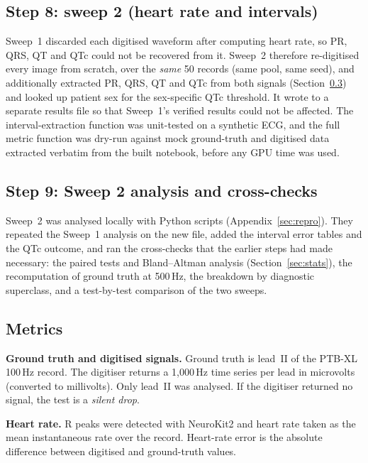 \subsection{Step 8: sweep 2 (heart rate and intervals)}\label{sec:sweep2}
Sweep~1 discarded each digitised waveform after computing heart rate, so PR, QRS, QT and QTc could not be recovered from it. Sweep~2 therefore re-digitised every image from scratch, over the \emph{same} 50 records (same pool, same seed), and additionally extracted PR, QRS, QT and QTc from both signals (Section~\ref{sec:metrics}) and looked up patient sex for the sex-specific QTc threshold. It wrote to a separate results file so that Sweep~1's verified results could not be affected. The interval-extraction function was unit-tested on a synthetic ECG, and the full metric function was dry-run against mock ground-truth and digitised data extracted verbatim from the built notebook, before any GPU time was used.

\subsection{Step 9: Sweep 2 analysis and cross-checks}\label{sec:sweep2analysis}
Sweep~2 was analysed locally with Python scripts (Appendix~\ref{sec:repro}). They repeated the Sweep~1 analysis on the new file, added the interval error tables and the QTc outcome, and ran the cross-checks that the earlier steps had made necessary: the paired tests and Bland--Altman analysis (Section~\ref{sec:stats}), the recomputation of ground truth at 500\,Hz, the breakdown by diagnostic superclass, and a test-by-test comparison of the two sweeps.

\subsection{Metrics}\label{sec:metrics}
\textbf{Ground truth and digitised signals.} Ground truth is lead~II of the PTB-XL 100\,Hz record. The digitiser returns a 1{,}000\,Hz time series per lead in microvolts (converted to millivolts). Only lead~II was analysed. If the digitiser returned no signal, the test is a \emph{silent drop}.

\textbf{Heart rate.} R peaks were detected with NeuroKit2 and heart rate taken as the mean instantaneous rate over the record. Heart-rate error is the absolute difference between digitised and ground-truth values.


